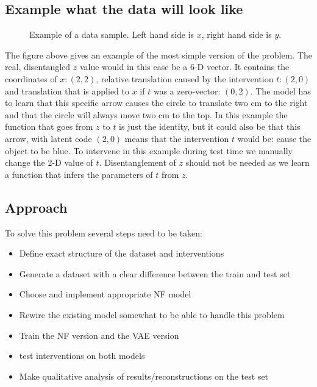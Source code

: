 \documentclass{article}
\begin{document}
\subsection{Example what the data will look like}
\begin{figure}
    \centering
\quad
{}
    \caption{Example of a data sample. Left hand side is $x$, right hand side is $y$.}
    \label{fig:my_label}
\end{figure}
 The figure above gives an example of the most simple version of the problem. The real, disentangled $z$ value would in this case be a 6-D vector. It contains the coordinates of $x:(2,2)$, relative translation caused by the intervention $t: (2, 0)$ and translation that is applied to $x$ if $t$ was a zero-vector: $(0, 2)$. The model has to learn that this specific arrow causes the circle to translate two cm to the right and that the circle will always move two cm to the top. In this example the function that goes from $z$ to $t$ is just the identity, but it could also be that this arrow, with latent code $(2, 0)$ means that the intervention $t$ would be: cause the object to be blue.  To intervene in this example during test time we manually change the 2-D value of $t$. Disentanglement of $z$ should not be needed as we learn a function that infers the parameters of $t$ from $z$.



\subsection{Approach}
To solve this problem several steps need to be taken:
\begin{itemize}
    \item Define exact structure of the dataset and interventions
    \item Generate a dataset with a clear difference between the train and test set
    \item Choose and implement appropriate NF model
    \item Rewire the existing model somewhat to be able to handle this problem
    \item Train the NF version and the VAE version
    \item test interventions on both models
    \item Make qualitative analysis of results/reconstructions on the test set
\end{itemize}



\end{document}
